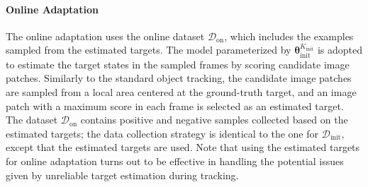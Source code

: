 \documentclass[letterpaper]{article} %
\def \datainit{\mathcal{D}_\text{init}}
\def \dataonline{\mathcal{D}_\text{on}}
\def \thetainitadapt{\boldsymbol{\theta}_\text{init}}
\def \Kinit{K_\text{init}}
\begin{document}
\paragraph{Online Adaptation}
The online adaptation uses the online dataset $\dataonline$, which includes the examples sampled from the estimated targets.
The model parameterized by $\thetainitadapt^{\Kinit}$ is adopted to estimate the target states in the sampled frames by scoring candidate image patches.
Similarly to the standard object tracking, the candidate image patches are sampled from a local area centered at the ground-truth target, and an image patch with a maximum score in each frame is selected as an estimated target.
The dataset $\dataonline$ contains positive and negative samples collected based on the estimated targets; the data collection strategy is identical to the one for $\datainit$, except that the estimated targets are used.
Note that using the estimated targets for online adaptation turns out to be effective in handling the potential issues given by unreliable target estimation during tracking.

\end{document}
